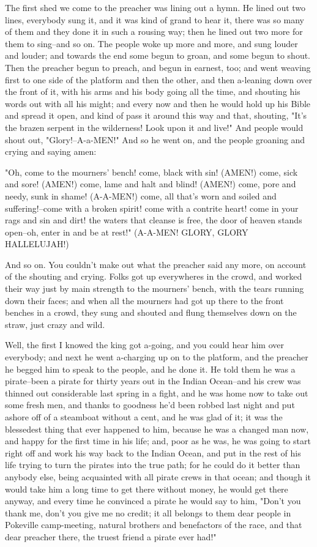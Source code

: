 The first shed we come to the preacher was lining out a hymn.  He lined
out two lines, everybody sung it, and it was kind of grand to hear it,
there was so many of them and they done it in such a rousing way; then he
lined out two more for them to sing--and so on.  The people woke up more
and more, and sung louder and louder; and towards the end some begun to
groan, and some begun to shout.  Then the preacher begun to preach, and
begun in earnest, too; and went weaving first to one side of the platform
and then the other, and then a-leaning down over the front of it, with
his arms and his body going all the time, and shouting his words out with
all his might; and every now and then he would hold up his Bible and
spread it open, and kind of pass it around this way and that, shouting,
"It's the brazen serpent in the wilderness!  Look upon it and live!"  And
people would shout out, "Glory!--A-a-MEN!"  And so he went on, and the
people groaning and crying and saying amen:

"Oh, come to the mourners' bench! come, black with sin! (AMEN!) come,
sick and sore! (AMEN!) come, lame and halt and blind! (AMEN!) come, pore
and needy, sunk in shame! (A-A-MEN!) come, all that's worn and soiled and
suffering!--come with a broken spirit! come with a contrite heart! come
in your rags and sin and dirt! the waters that cleanse is free, the door
of heaven stands open--oh, enter in and be at rest!" (A-A-MEN!  GLORY,
GLORY HALLELUJAH!)

And so on.  You couldn't make out what the preacher said any more, on
account of the shouting and crying.  Folks got up everywheres in the
crowd, and worked their way just by main strength to the mourners' bench,
with the tears running down their faces; and when all the mourners had
got up there to the front benches in a crowd, they sung and shouted and
flung themselves down on the straw, just crazy and wild.

Well, the first I knowed the king got a-going, and you could hear him
over everybody; and next he went a-charging up on to the platform, and
the preacher he begged him to speak to the people, and he done it.  He
told them he was a pirate--been a pirate for thirty years out in the
Indian Ocean--and his crew was thinned out considerable last spring in
a fight, and he was home now to take out some fresh men, and thanks to
goodness he'd been robbed last night and put ashore off of a steamboat
without a cent, and he was glad of it; it was the blessedest thing that
ever happened to him, because he was a changed man now, and happy for the
first time in his life; and, poor as he was, he was going to start right
off and work his way back to the Indian Ocean, and put in the rest of his
life trying to turn the pirates into the true path; for he could do it
better than anybody else, being acquainted with all pirate crews in that
ocean; and though it would take him a long time to get there without
money, he would get there anyway, and every time he convinced a pirate he
would say to him, "Don't you thank me, don't you give me no credit; it
all belongs to them dear people in Pokeville camp-meeting, natural
brothers and benefactors of the race, and that dear preacher there, the
truest friend a pirate ever had!"

